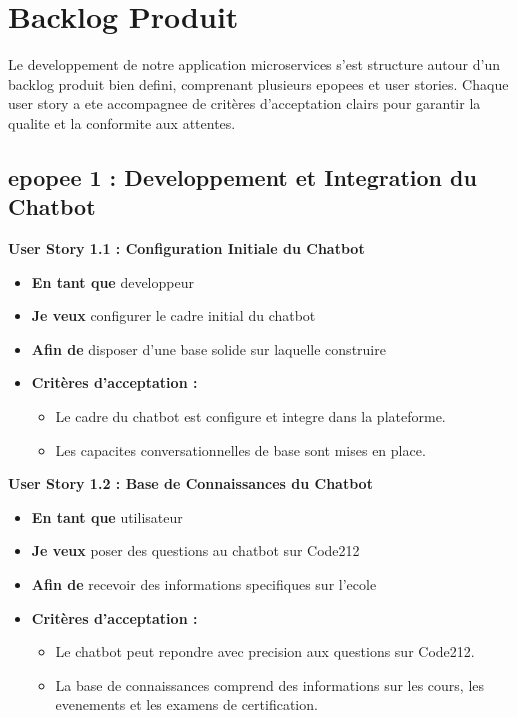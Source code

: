 \documentclass[a4paper, 11pt, openany]{report}
\begin{document}
\section{Backlog Produit}

Le developpement de notre application microservices s'est structure autour d'un backlog produit bien defini, comprenant plusieurs epopees et user stories. Chaque user story a ete accompagnee de critères d'acceptation clairs pour garantir la qualite et la conformite aux attentes.

\subsection{epopee 1 : Developpement et Integration du Chatbot}

\textbf{User Story 1.1 : Configuration Initiale du Chatbot}
\begin{itemize}
    \item \textbf{En tant que} developpeur
    \item \textbf{Je veux} configurer le cadre initial du chatbot
    \item \textbf{Afin de} disposer d'une base solide sur laquelle construire
    \item \textbf{Critères d'acceptation :}
    \begin{itemize}
        \item Le cadre du chatbot est configure et integre dans la plateforme.
        \item Les capacites conversationnelles de base sont mises en place.
    \end{itemize}
\end{itemize}

\textbf{User Story 1.2 : Base de Connaissances du Chatbot}
\begin{itemize}
    \item \textbf{En tant que} utilisateur
    \item \textbf{Je veux} poser des questions au chatbot sur Code212
    \item \textbf{Afin de} recevoir des informations specifiques sur l'ecole
    \item \textbf{Critères d'acceptation :}
    \begin{itemize}
        \item Le chatbot peut repondre avec precision aux questions sur Code212.
        \item La base de connaissances comprend des informations sur les cours, les evenements et les examens de certification.
    \end{itemize}
\end{itemize}
\end{document}
